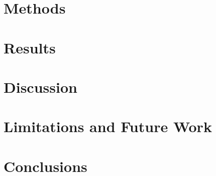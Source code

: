 \documentclass[11pt]{article}
\begin{document}
\section{Methods}
\label{sec:methods}

\newpage

\section{Results}
\label{sec:results}

\newpage

\section{Discussion}
\label{sec:discussion}

\newpage

\section{Limitations and Future Work}
\label{sec:limitations}

\newpage

\section{Conclusions}
\label{sec:conclusions}


{}
\begingroup
\raggedright


\endgroup
\newpage


\end{document}

